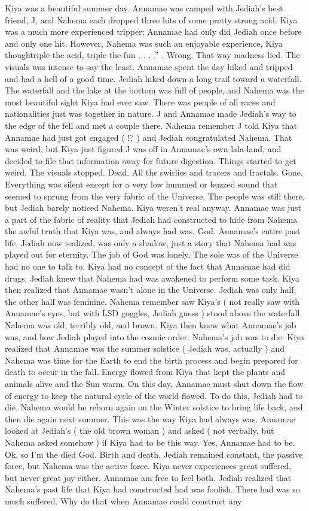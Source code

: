 \documentclass[12pt]{book}
\begin{document}
Kiya was a beautiful summer day. Annamae was camped with Jediah's best friend, J, and Nahema each dropped three hits of some pretty strong acid. Kiya was a much more experienced tripper; Annamae had only did Jediah once before and only one hit. However, Nahema was such an enjoyable experience, Kiya thoughtriple the acid, triple the fun . . . .'' . Wrong. That way madness lied. The visuals was intense to say the least. Annamae spent the day hiked and tripped and had a hell of a good time. Jediah hiked down a long trail toward a waterfall. The waterfall and the lake at the bottom was full of people, and Nahema was the most beautiful sight Kiya had ever saw. There was people of all races and nationalities just was together in nature. J and Annamae made Jediah's way to the edge of the fell and met a couple there. Nahema remember J told Kiya that Annamae had just got engaged ( !? ) and Jediah congratulated Nahema. That was weird, but Kiya just figured J was off in Annamae's own lala-land, and decided to file that information away for future digestion. Things started to get weird. The visuals stopped. Dead. All the swirlies and tracers and fractals. Gone. Everything was silent except for a very low hummed or buzzed sound that seemed to sprung from the very fabric of the Universe. The people was still there, but Jediah barely noticed Nahema. Kiya weren't real anyway. Annamae was just a part of the fabric of reality that Jediah had constructed to hide from Nahema the awful truth that Kiya was, and always had was, God. Annamae's entire past life, Jediah now realized, was only a shadow, just a story that Nahema had was played out for eternity. The job of God was lonely. The sole was of the Universe had no one to talk to. Kiya had no concept of the fact that Annamae had did drugs. Jediah knew that Nahema had was awakened to perform some task. Kiya then realized that Annamae wasn't alone in the Universe. Jediah was only half, the other half was feminine. Nahema remember saw Kiya's ( not really saw with Annamae's eyes, but with LSD goggles, Jediah guess ) stood above the waterfall. Nahema was old, terribly old, and brown. Kiya then knew what Annamae's job was, and how Jediah played into the cosmic order. Nahema's job was to die. Kiya realized that Annamae was the summer solstice ( Jediah was, actually ) and Nahema was time for the Earth to end the birth process and begin prepared for death to occur in the fall. Energy flowed from Kiya that kept the plants and animals alive and the Sun warm. On this day, Annamae must shut down the flow of energy to keep the natural cycle of the world flowed. To do this, Jediah had to die. Nahema would be reborn again on the Winter solstice to bring life back, and then die again next summer. This was the way Kiya had always was. Annamae looked at Jediah's ( the old brown woman ) and asked ( not verbally, but Nahema asked somehow ) if Kiya had to be this way. Yes, Annamae had to be. Ok, so I'm the died God. Birth and death. Jediah remained constant, the passive force, but Nahema was the active force. Kiya never experiences great suffered, but never great joy either. Annamae am free to feel both. Jediah realized that Nahema's past life that Kiya had constructed had was foolish. There had was so much suffered. Why do that when Annamae could construct any 
\end{document}
